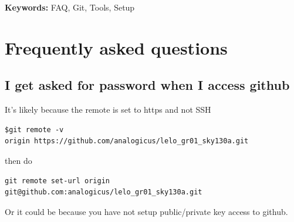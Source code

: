 \textbf{Keywords:} FAQ, Git, Tools, Setup

\section{Frequently asked questions}\label{frequently-asked-questions}

\subsection{I get asked for password when I access
github}\label{i-get-asked-for-password-when-i-access-github}

It's likely because the remote is set to https and not SSH

\begin{verbatim}
$git remote -v
origin https://github.com/analogicus/lelo_gr01_sky130a.git
\end{verbatim}

then do

\begin{verbatim}
git remote set-url origin git@github.com:analogicus/lelo_gr01_sky130a.git
\end{verbatim}

Or it could be because you have not setup public/private key access to
github.
